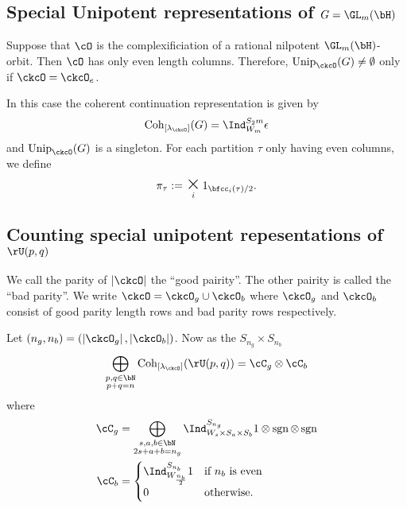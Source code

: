 \documentclass[12pt,a4paper]{amsart}
\def\abs#1{\left|{#1}\right|}
\newcommand{\sgn}{\operatorname{sgn}}
\newcommand{\p}{\mathfrak p}
\numberwithin{equation}{section}
\theoremstyle{remark}
\def\Unip{\mathrm{Unip}}
\def\lamck{\lambda_\ckcO}
\def\Cint#1{\Coh_{[#1]}}
\def\Coh{\mathrm{Coh}}
\begin{document}
\subsection{Special Unipotent representations of $G=\GL_{m}(\bH)$}

Suppose that $\cO$ is the complexificiation of a rational nilpotent $\GL_{m}(\bH)$-orbit. 
Then $\cO$ has only even length columns. 
Therefore, $\Unip_\ckcO(G) \neq\emptyset$ only if $\ckcO = \ckcO_e$. 

In this case the coherent continuation representation is given by  
\[
  \Cint{\lamck}(G) = \Ind_{W_m}^{S_2m}\epsilon 
\]
and $\Unip_\ckcO(G)$ is a singleton. %
For each partition $\tau$ only having even columns, we define 
\[
  \pi_{\tau} := \bigtimes_i 1_{\bfcc_i(\tau)/2}. 
\] 

\subsection{Counting special unipotent repesentations of $\rU(p,q)$}
We call the parity of $\abs{\ckcO}$ the ``good pairity''.  The other pairity is called the ``bad parity''. 
We write $\ckcO = \ckcO_g\cup \ckcO_b$ where $\ckcO_g$ and $\ckcO_b$ consist of good parity length rows
and bad parity rows respectively.

Let $(n_g,n_b) = (\abs{\ckcO_g},\abs{\ckcO_b})$.
Now as the $S_{n_g}\times S_{n_b}$ 
\[
\bigoplus_{\substack{p,q\in \bN\\p+q=n}} \Cint{\lamck}(\rU(p,q)) = \cC_{g}\otimes \cC_{b}
\]
where 
\[
  \begin{split}
 \cC_{g} &= \bigoplus_{\substack{s,a,b\in \bN\\2s+a+b=n_g}} \Ind_{W_{s}\times S_a\times S_b}^{S_{n_g}}
 1\otimes \sgn\otimes \sgn \\
 \cC_{b} &= \begin{cases}
  \Ind_{W_{\frac{n_b}{2}}}^{S_{n_b}} 1 & \text{if $n_b$ is even}\\
  0 & \text{otherwise}. 
 \end{cases}
  \end{split}
\]
\end{document}
